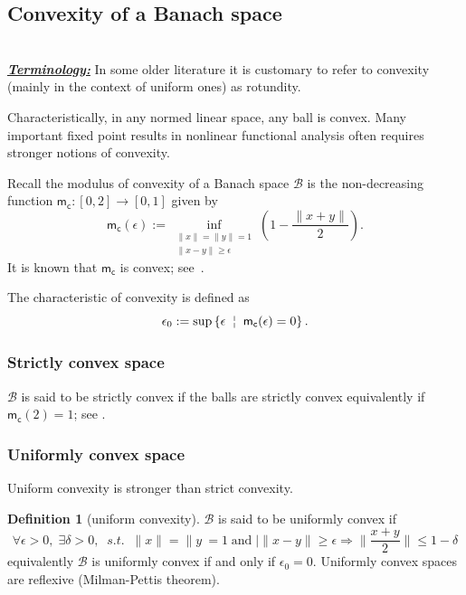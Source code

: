 \documentclass[a4, 12pt,leqno]{amsart}
\theoremstyle{plain}
\theoremstyle{definition}
\newtheorem{definition}[lemma]{Definition}
\theoremstyle{remark}
\numberwithin{equation}{section}
\newcommand{\B}{\mathcal{B}}
\begin{document}
\subsection{Convexity of a Banach space}
\hfill\\
\noindent\underline{\small \emph{\textbf{Terminology:}}} In some older literature it is customary to refer to convexity (mainly in the context of uniform ones) as rotundity.
\par Characteristically, in any normed linear space, any ball is convex. Many important fixed point results in nonlinear functional analysis often requires stronger notions of convexity. 
\par Recall the modulus of convexity of a Banach space $\B$ is the non-decreasing function $\mathsf{m_c}: [0,2] \to [0,1]$ given by~\cite{Opial}
\[
\mathsf{m_c}(\epsilon) := \inf_{\substack{\|x\|= \|y\|=1\\
\|x-y\|\ge \epsilon}} \left( 1 - \frac{\|x+y\|}{2}  \right).
\]
It is known that $\mathsf{m_c}$ is convex; see~\cite{Goeb}.
\par The characteristic of convexity is defined as~\cite{Goeb}
\[
\epsilon_0 := \sup \left\{\epsilon \; \;\text{\textbrokenbar}\;\; \mathsf{m_c}(\epsilon) = 0 \right\}.
\]

\subsubsection{Strictly convex space}
$\B$ is said to be strictly convex if the balls are strictly convex equivalently if $\mathsf{m_c}(2) = 1$; see \cite{Clarc}.

\subsubsection{Uniformly convex space}
Uniform convexity is stronger than strict convexity.
\begin{definition}[uniform convexity]
$\B$ is said to be  uniformly convex if 
\[
\forall \epsilon>0, \; \exists \delta >0 , \;\; s.t. \;\; \|x\|=\|y\ = 1 \;\text{and} \;|\|x-y\|\ge \epsilon \Longrightarrow \|\frac{x+y}{2}\| \le  1 - \delta 
\]
equivalently $\B$ is uniformly convex if and only if $\epsilon_0 = 0$. Uniformly convex spaces are reflexive (Milman-Pettis theorem).
 
\end{definition}
\end{document}

